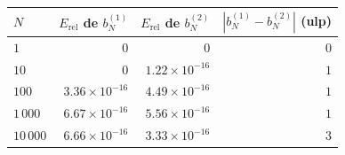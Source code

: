 \begin{tabular}{lrrr}
\toprule
$N$ & $E_\mathrm{rel}$ de $b_N^{(1)}$ & $E_\mathrm{rel}$ de $b_N^{(2)}$ & $|b_N^{(1)} - b_N^{(2)}|$ (ulp) \\
\midrule
$1$ & $0$ & $0$ & $0$ \\
$10$ & $0$ & $1.22 \times 10^{-16}$ & $1$ \\
$100$ & $3.36 \times 10^{-16}$ & $4.49 \times 10^{-16}$ & $1$ \\
$1\,000$ & $6.67 \times 10^{-16}$ & $5.56 \times 10^{-16}$ & $1$ \\
$10\,000$ & $6.66 \times 10^{-16}$ & $3.33 \times 10^{-16}$ & $3$ \\
\bottomrule
\end{tabular}
